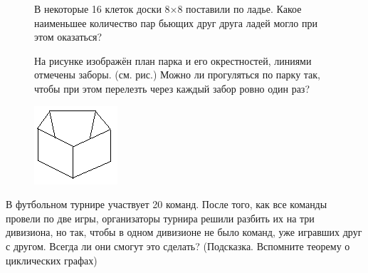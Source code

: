 \begin{figure}[H]
    \begin{minipage}{0.89\linewidth}\setlength{\parindent}{1.5em}
        \begin{thm}
             В некоторые 16 клеток доски 8×8 поставили по ладье. Какое наименьшее количество пар бьющих друг друга ладей могло при этом оказаться?
        \end{thm}
        \begin{thm}
            На рисунке изображён план парка и его окрестностей, линиями отмечены заборы. (см. рис.) Можно ли прогуляться по парку так, чтобы при этом перелезть через каждый забор ровно один раз?
        \end{thm}
    \end{minipage}
\hfill
    \begin{minipage}{0.1\linewidth}
        \includegraphics[width=0.95\columnwidth]{img/10.4 figure.png}
    \end{minipage}
\end{figure}

\begin{thm}
    В футбольном турнире участвует 20 команд. После того, как все команды провели по две игры, организаторы турнира решили разбить их на три дивизиона, но так, чтобы в одном дивизионе не было команд, уже игравших друг с другом. Всегда ли они смогут это сделать? (Подсказка. Вспомните теорему о циклических графах)
\end{thm}

